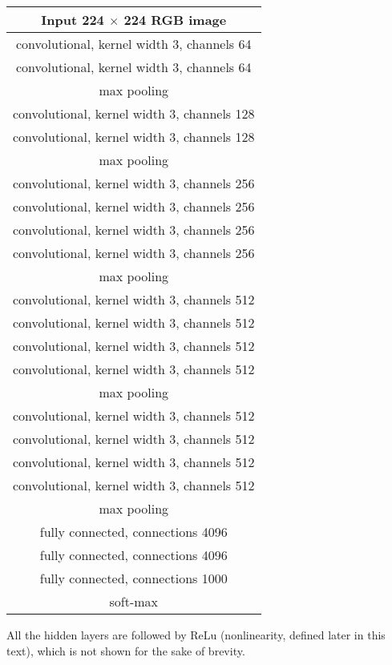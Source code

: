 \documentclass[]{article}
\begin{document}
\begin{center}
\begin{tabular}{|c|}
  \hline
  Input 224 $\times$ 224 RGB image\\
  \hline
  convolutional, kernel width 3, channels 64\\
  \hline
  convolutional, kernel width 3, channels 64\\
  \hline
  max pooling\\
  \hline
  convolutional, kernel width 3, channels 128\\
  \hline
  convolutional, kernel width 3, channels 128\\
  \hline
  max pooling\\
  \hline
  convolutional, kernel width 3, channels 256\\
  \hline
  convolutional, kernel width 3, channels 256\\
  \hline
  convolutional, kernel width 3, channels 256\\
  \hline
  convolutional, kernel width 3, channels 256\\
  \hline
  max pooling\\
  \hline
  convolutional, kernel width 3, channels 512\\
  \hline
  convolutional, kernel width 3, channels 512\\
  \hline
  convolutional, kernel width 3, channels 512\\
  \hline
  convolutional, kernel width 3, channels 512\\
  \hline
  max pooling\\
  \hline
  convolutional, kernel width 3, channels 512\\
  \hline
  convolutional, kernel width 3, channels 512\\
  \hline
  convolutional, kernel width 3, channels 512\\
  \hline
  convolutional, kernel width 3, channels 512\\
  \hline
  max pooling\\
  \hline
  fully connected, connections 4096\\
  \hline
  fully connected, connections 4096\\
  \hline
  fully connected, connections 1000\\
  \hline
  soft-max\\
  \hline
\end{tabular}
\end{center}
All the hidden layers are followed by ReLu (nonlinearity, defined later in this text),
which is not shown for the sake of brevity.
\end{document}
